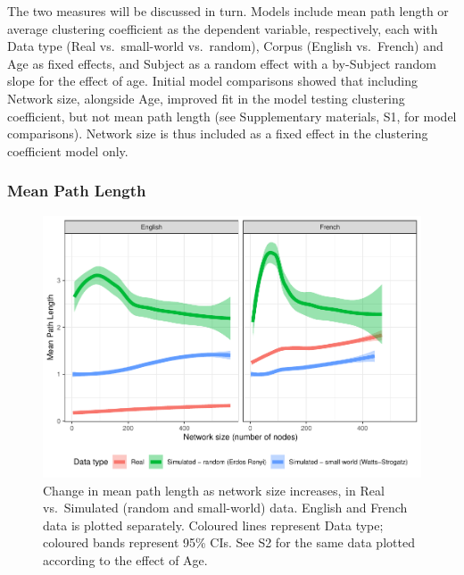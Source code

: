 \documentclass[
  man]{apa6}
\begin{document}
The two measures will be discussed in turn. Models include mean path length or average clustering coefficient as the dependent variable, respectively, each with Data type (Real vs.~small-world vs.~random), Corpus (English vs.~French) and Age as fixed effects, and Subject as a random effect with a by-Subject random slope for the effect of age. Initial model comparisons showed that including Network size, alongside Age, improved fit in the model testing clustering coefficient, but not mean path length (see Supplementary materials, S1, for model comparisons). Network size is thus included as a fixed effect in the clustering coefficient model only.

\subsubsection{Mean Path Length}\label{mean-path-length}

\begin{figure}
\centering
\includegraphics{NetworkGraphs_R1_files/figure-latex/Figure-path-length-1.pdf}
\caption{\label{fig:Figure-path-length}Change in mean path length as network size increases, in Real vs.~Simulated (random and small-world) data. English and French data is plotted separately. Coloured lines represent Data type; coloured bands represent 95\% CIs. See S2 for the same data plotted according to the effect of Age.}
\end{figure}
\end{document}
